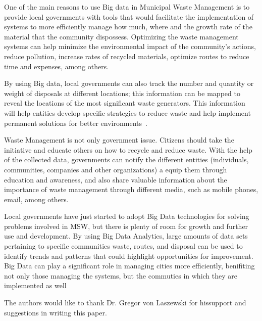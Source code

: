 \documentclass[sigconf]{acmart}
\begin{document}
One of the main reasons to use Big data in Municipal Waste Management is to provide local governments with tools that would facilitate the implementation of systems to more efficiently manage how much, where and the growth rate of the material that the community dispossess. Optimizing the waste management systems can help minimize the environmental impact of the community's actions, reduce pollution, increase rates of recycled materials, optimize routes to reduce time and expenses, among others.

By using Big data, local governments can also track the number and quantity or weight of disposals at different locations; this information can be mapped to reveal the locations of the most significant waste generators.  This information will help entities develop specific strategies to reduce waste and help implement permanent solutions for better environments~\cite{markvan2016}. 

Waste Management is not only government issue. Citizens should take the initiative and educate others on how to recycle and reduce waste. With the help of the collected data, governments can notify the different entities (individuals, communities, companies and other organizations) a equip them through education and awareness, and also share valuable information about the importance of waste management through different media, such as mobile phones, email, among others.

Local governments have just started to adopt Big Data technologies for solving problems involved in MSW, but there is plenty of room for growth and further use and development.  By using Big Data Analytics, large amounts of data sets pertaining to specific communities waste, routes, and disposal can be used to identify trends and patterns that could highlight opportunities for improvement. Big Data can play a significant role in managing cities more efficiently, benifiting not only those managing the systems, but the commuties in which they are implemented as well

\begin{acks}
The authors would like to thank Dr. Gregor von Laszewski for hissupport and suggestions in writing this paper.

\end{acks}


 
\end{document}
